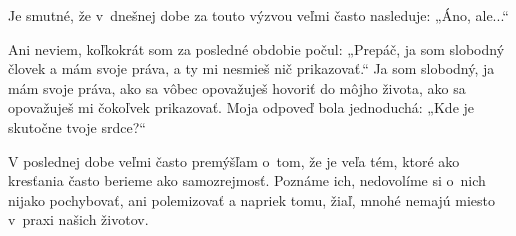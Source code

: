 







Je smutné, že v~dnešnej dobe za touto výzvou veľmi často nasleduje: „Áno, ale...“ 

Ani neviem, koľkokrát som za posledné obdobie počul: „Prepáč, ja som slobodný človek a mám svoje práva, a ty mi nesmieš nič prikazovať.“ Ja som slobodný, ja mám svoje práva, ako sa vôbec opovažuješ hovoriť do môjho života, ako sa opovažuješ mi čokoľvek prikazovať. Moja odpoveď bola jednoduchá: „Kde je skutočne tvoje srdce?“ 

V poslednej dobe veľmi často premýšľam o~tom, že je veľa tém, ktoré ako kresťania často berieme ako samozrejmosť. Poznáme ich, nedovolíme si o~nich nijako pochybovať, ani polemizovať a napriek tomu, žiaľ, mnohé nemajú miesto v~praxi našich životov.

